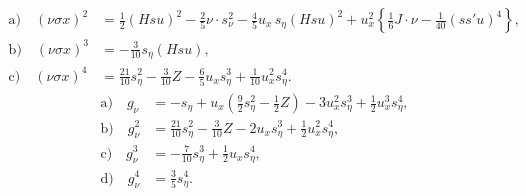 \documentclass[11pt]{article}
\begin{document}
\[
\tag{7}
\begin{aligned}
\mathrm{a)}\quad (\nu\sigma x)^2
&=\frac12(Hsu)^2-\frac25\nu\cdot s_\nu^2-
\frac45u_x\,s_\eta(Hsu)^2
+u_x^2\left\{\frac16J\cdot\nu-\frac1{40}(ss'u)^4\right\},\\
\mathrm{b)}\quad (\nu\sigma x)^3&=-\frac3{10}s_\eta(Hsu),\\
\mathrm{c)}\quad (\nu\sigma x)^4&=\frac{21}{10}s_\eta^2-\frac3{10}Z-
\frac65u_xs_\eta^3+\frac1{10}u_x^2s_\eta^4.
\end{aligned}
\]
\[
\tag{8}
\begin{aligned}
\mathrm{a)}\quad g_\nu&=-s_\eta+u_x\left(\frac92s_\eta^2-\frac12Z\right)-3u_x^2s_\eta^3+\frac12u_x^3s_\eta^4,\\
\mathrm{b)}\quad g_\nu^2&=\frac{21}{10}s_\eta^2-\frac3{10}Z-2u_xs_\eta^3+\frac12u_x^2s_\eta^4,\\
\mathrm{c)}\quad g_\nu^3&=-\frac7{10}s_\eta^3+\frac12u_xs_\eta^4,\\
\mathrm{d)}\quad g_\nu^4&=\frac35s_\eta^4.
\end{aligned}
\]
\end{document}
